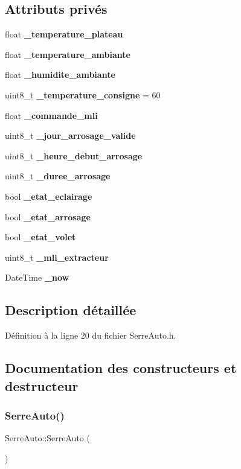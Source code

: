 \subsection*{Attributs privés}
\begin{DoxyCompactItemize}
\item 
float \textbf{ \+\_\+temperature\+\_\+plateau}
\item 
float \textbf{ \+\_\+temperature\+\_\+ambiante}
\item 
float \textbf{ \+\_\+humidite\+\_\+ambiante}
\item 
uint8\+\_\+t \textbf{ \+\_\+temperature\+\_\+consigne} = 60
\item 
float \textbf{ \+\_\+commande\+\_\+mli}
\item 
uint8\+\_\+t \textbf{ \+\_\+jour\+\_\+arrosage\+\_\+valide}
\item 
uint8\+\_\+t \textbf{ \+\_\+heure\+\_\+debut\+\_\+arrosage}
\item 
uint8\+\_\+t \textbf{ \+\_\+duree\+\_\+arrosage}
\item 
bool \textbf{ \+\_\+etat\+\_\+eclairage}
\item 
bool \textbf{ \+\_\+etat\+\_\+arrosage}
\item 
bool \textbf{ \+\_\+etat\+\_\+volet}
\item 
uint8\+\_\+t \textbf{ \+\_\+mli\+\_\+extracteur}
\item 
Date\+Time \textbf{ \+\_\+now}
\end{DoxyCompactItemize}


\subsection{Description détaillée}


Définition à la ligne 20 du fichier Serre\+Auto.\+h.



\subsection{Documentation des constructeurs et destructeur}
\mbox{\label{class_serre_auto_ab4f42b527c7f29b49c409439fe75e432}} 
\subsubsection{Serre\+Auto()}
{\footnotesize\ttfamily Serre\+Auto\+::\+Serre\+Auto (\begin{DoxyParamCaption}{ }\end{DoxyParamCaption})}



